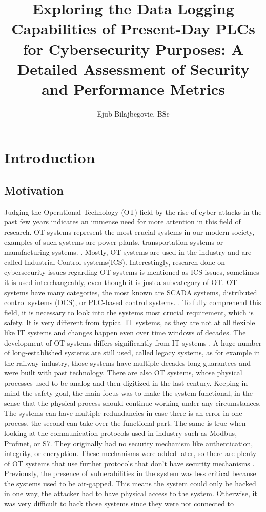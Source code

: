 \documentclass[Master,BMR,english]{twbook}
\title{Exploring the Data Logging Capabilities of Present-Day PLCs for Cybersecurity Purposes: A Detailed Assessment of Security and Performance Metrics}
\author{Ejub Bilajbegovic, BSc}
\begin{document}
\maketitle
\chapter{Introduction}

\section{Motivation}


Judging the Operational Technology (OT) field by the rise of cyber-attacks in the past few years indicates an immense need for more attention in this field of research. OT systems represent the most crucial systems in our modern society, examples of such systems are power plants, transportation systems or manufacturing systems. \cite{allison_plc-based_nodate} \cite{stouffer_guide_2015}. Mostly, OT systems are used in the industry and are called Industrial Control systems(ICS). Interestingly, research done on cybersecurity issues regarding OT systems is mentioned as ICS issues, sometimes it is used interchangeably, even though it is just a subcategory of OT. OT systems have many categories, the most known are SCADA systems, distributed control systems (DCS), or PLC-based control systems. \cite{ara_security_2022} \cite{conklin_it_2016}  \cite{stouffer_guide_2015}. To fully comprehend this field, it is necessary to look into the systems most crucial requirement, which is safety. It is very different from typical IT systems, as they are not at all flexible like IT systems and changes happen even over time windows of decades. The development of OT systems differs significantly from IT systems \cite{conti_survey_2021}. A huge number of long-established systems are still used, called legacy systems, as for example in the railway industry, those systems have multiple decades-long guarantees and were built with past technology. There are also OT systems, whose physical processes used to be analog and then digitized in the last century. Keeping in mind the safety goal, the main focus was to make the system functional, in the sense that the physical process should continue working under any circumstances. The systems can have multiple redundancies in case there is an error in one process, the second can take over the functional part. The same is true when looking at the communication protocols used in industry such as Modbus, Profinet, or S7. They originally had no security mechanism like authentication, integrity, or encryption. These mechanisms were added later, so there are plenty of OT systems that use further protocols that don't have security mechanisms \cite{stouffer_guide_2015} \cite{ara_security_2022}. Previously, the presence of vulnerabilities in the system was less critical because the systems used to be air-gapped. This means the system could only be hacked in one way, the attacker had to have physical access to the system. Otherwise, it was very difficult to hack those systems since they were not connected to 
\end{document}
